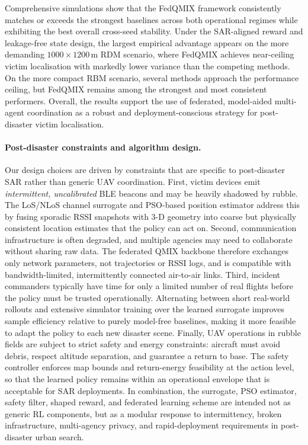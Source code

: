 \documentclass[drones,article,accept,pdftex,moreauthors]{Definitions/mdpi}
\begin{document}
Comprehensive simulations show that the FedQMIX framework consistently
matches or exceeds the strongest baselines across both operational regimes while
exhibiting the best overall cross-seed stability. Under the SAR-aligned
reward and leakage-free state design, the largest empirical advantage appears on
the more demanding $1000{\times}1200$\,m RDM scenario, where FedQMIX achieves
near-ceiling victim localisation with markedly lower variance than the competing
methods. On the more compact RBM scenario, several methods approach the
performance ceiling, but FedQMIX remains among the strongest and most consistent
performers. Overall, the results support the use of federated,
model-aided multi-agent coordination as a robust and deployment-conscious
strategy for post-disaster victim localisation.

\paragraph{Post-disaster constraints and algorithm design.}
Our design choices are driven by constraints that are specific to post-disaster SAR rather than generic UAV coordination. First, victim devices emit \emph{intermittent, uncalibrated} BLE beacons and may be heavily shadowed by rubble. The LoS/NLoS channel surrogate and PSO-based position estimator address this by fusing sporadic RSSI snapshots with 3-D geometry into coarse but physically consistent location estimates that the policy can act on. Second, communication infrastructure is often degraded, and multiple agencies may need to collaborate without sharing raw data. The federated QMIX backbone therefore exchanges only network parameters, not trajectories or RSSI logs, and is compatible with bandwidth-limited, intermittently connected air-to-air links. Third, incident commanders typically have time for only a limited number of real flights before the policy must be trusted operationally. Alternating between short real-world rollouts and extensive simulator training over the learned surrogate improves sample efficiency relative to purely model-free baselines, making it more feasible to adapt the policy to each new disaster scene. Finally, UAV operations in rubble fields are subject to strict safety and energy constraints: aircraft must avoid debris, respect altitude separation, and guarantee a return to base. The safety controller enforces map bounds and return-energy feasibility at the action level, so that the learned policy remains within an operational envelope that is acceptable for SAR deployments. In combination, the surrogate, PSO estimator, safety filter, shaped reward, and federated learning scheme are intended not as generic RL components, but as a modular response to intermittency, broken infrastructure, multi-agency privacy, and rapid-deployment requirements in post-disaster urban search.
\end{document}
